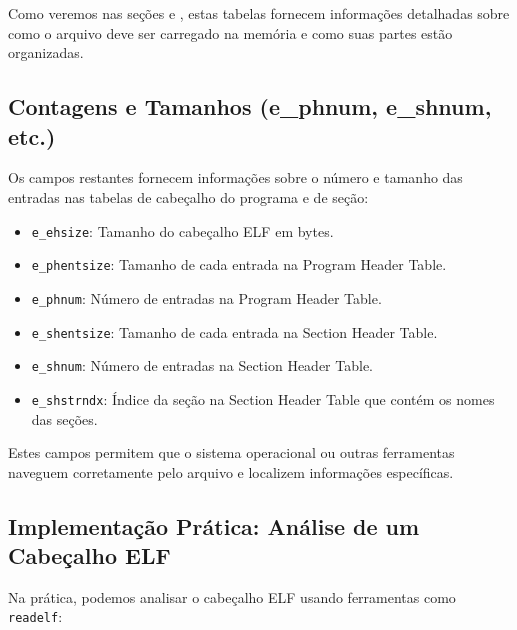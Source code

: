 Como veremos nas seções  e , estas tabelas fornecem informações detalhadas sobre como o arquivo deve ser carregado na memória e como suas partes estão organizadas.

\subsection{Contagens e Tamanhos (e\_phnum, e\_shnum, etc.)}\label{subsec:counts_sizes}

Os campos restantes fornecem informações sobre o número e tamanho das entradas nas tabelas de cabeçalho do programa e de seção:

\begin{itemize}
    \item \texttt{e\_ehsize}: Tamanho do cabeçalho ELF em bytes.
    \item \texttt{e\_phentsize}: Tamanho de cada entrada na Program Header Table.
    \item \texttt{e\_phnum}: Número de entradas na Program Header Table.
    \item \texttt{e\_shentsize}: Tamanho de cada entrada na Section Header Table.
    \item \texttt{e\_shnum}: Número de entradas na Section Header Table.
    \item \texttt{e\_shstrndx}: Índice da seção na Section Header Table que contém os nomes das seções.
\end{itemize}

Estes campos permitem que o sistema operacional ou outras ferramentas naveguem corretamente pelo arquivo e localizem informações específicas.

\subsection{Implementação Prática: Análise de um Cabeçalho ELF}\label{subsec:elf_header_analysis}

Na prática, podemos analisar o cabeçalho ELF usando ferramentas como \texttt{readelf}:

